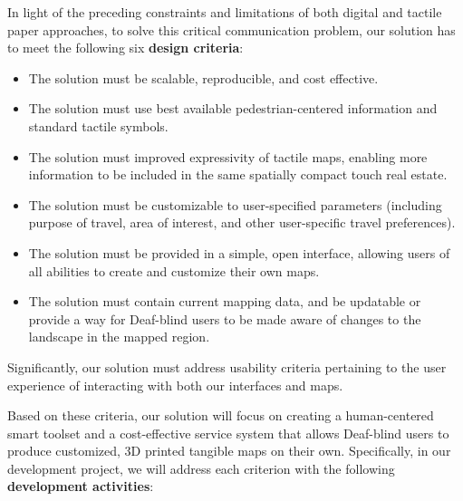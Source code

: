 In light of the preceding constraints and limitations of both digital and tactile paper approaches, to solve this critical communication problem, our solution has to meet the following six \textbf{design criteria}: 
\begin{itemize}
 \item The solution must be scalable, reproducible, and cost effective. 
 \item The solution must use best available pedestrian-centered information and standard tactile symbols. 
 \item The solution must improved expressivity of tactile maps, enabling more information to be included in the same spatially compact touch real estate.
 \item The solution must be customizable to user-specified parameters (including purpose of travel, area of interest, and other user-specific travel preferences). 
 \item The solution must be provided in a simple, open interface, allowing users of all abilities to create and customize their own maps. 
 \item The solution must contain current mapping data, and be updatable or provide a way for Deaf-blind users to be made aware of changes to the landscape in the mapped region.
\end{itemize}
Significantly, our solution must address usability criteria pertaining to the user experience of interacting with both our interfaces and maps. 

Based on these criteria, our solution will focus on creating a human-centered smart toolset and a cost-effective service system that allows Deaf-blind users to produce customized, 3D printed tangible maps on their own. %
Specifically, in our development project, we will address each criterion with the following \textbf{development activities}:

